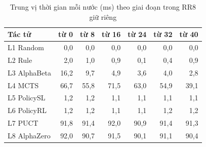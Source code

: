 \begin{table}[H]
  \centering
  \small
  \caption{Trung vị thời gian mỗi nước (ms) theo giai đoạn trong RR8 giữ riêng}
  \label{tab:cs-tk-thoigian}
  \begin{tabular}{lrrrrrr}
    \toprule
    Tác tử & từ 0 & từ 8 & từ 16 & từ 24 & từ 32 & từ 40 \\
    \midrule
    L1 Random & 0,0 & 0,0 & 0,0 & 0,0 & 0,0 & 0,0 \\
    L2 Rule & 2,0 & 1,0 & 0,9 & 0,1 & 0,4 & 0,9 \\
    L3 AlphaBeta & 16,2 & 9,7 & 4,9 & 3,6 & 4,0 & 2,8 \\
    L4 MCTS & 66,7 & 55,8 & 71,5 & 63,0 & 54,9 & 39,1 \\
    L5 PolicySL & 1,2 & 1,2 & 1,1 & 1,1 & 1,1 & 1,1 \\
    L6 PolicyRL & 1,2 & 1,2 & 1,1 & 1,1 & 1,2 & 1,2 \\
    L7 PUCT & 91,8 & 91,4 & 92,0 & 90,9 & 91,4 & 91,3 \\
    L8 AlphaZero & 92,0 & 90,7 & 91,5 & 90,1 & 91,1 & 90,4 \\
    \bottomrule
  \end{tabular}
\end{table}

